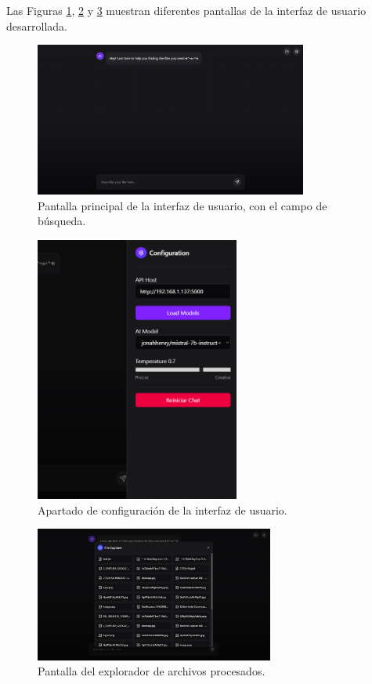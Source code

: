 Las Figuras \ref{fig:front_home}, \ref{fig:front_config} y \ref{fig:front_explorer} muestran diferentes pantallas de la interfaz de usuario desarrollada.

\begin{figure}[!htbp]
    \centering
    \includegraphics[width=0.8\textwidth]{archivos/front_home.png}
    \caption{Pantalla principal de la interfaz de usuario, con el campo de búsqueda.}
    \label{fig:front_home}
\end{figure}

\begin{figure}[!htbp]
    \centering
    \includegraphics[width=0.6\textwidth]{archivos/front_config.png}
    \caption{Apartado de configuración de la interfaz de usuario.}
    \label{fig:front_config}
\end{figure}

\begin{figure}[!htbp]
    \centering
    \includegraphics[width=0.7\textwidth]{archivos/front_explorer.png}
    \caption{Pantalla del explorador de archivos procesados.}
    \label{fig:front_explorer}
\end{figure}

